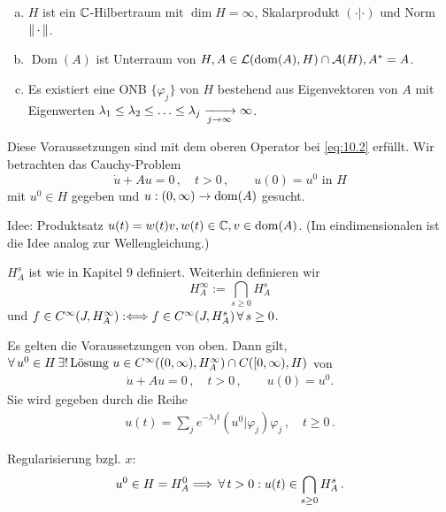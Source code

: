 \begin{vor}
\begin{enumerate}[(a)]
\item $H$ ist ein $\mathbb{C}$-Hilbertraum mit  $\dim H = \infty$, Skalarprodukt $( \cdot | \cdot  )$ und Norm $\lVert \,\cdot \,\rVert$.
\item $\operatorname{Dom}(A)$ ist Unterraum von $H, A \in \mathcal L(\operatorname{dom}(A),H)\cap \mathcal A(H), A^\ast = A$.
\item Es existiert eine ONB $\{\varphi_j\}$ von $H$ bestehend aus Eigenvektoren von $A$ mit Eigenwerten $\lambda_1 \leq \lambda_2 \leq \ldots \leq \lambda_j \xrightarrow[j \rightarrow \infty]{} \infty$.
\end{enumerate}
\end{vor}
Diese Voraussetzungen sind mit dem oberen Operator bei \eqref{eq:10.2} erfüllt. Wir betrachten das Cauchy-Problem
\[
	\dot u + A u = 0 \, , \quad t > 0 \, , \qquad u(0) = u^0 \text{ in } H
\]
mit $u^0 \in H$ gegeben und $u:(0,\infty) \rightarrow \operatorname{dom}(A)$ gesucht.

Idee: Produktsatz $u(t) = w(t) v, w(t) \in \mathbb{C}, v \in \operatorname{dom} (A)$. (Im eindimensionalen ist die Idee analog zur Wellengleichung.)

\begin{notation}
$H_A^s$ ist wie in Kapitel 9 definiert. Weiterhin definieren wir
\[
	H^\infty_A := \bigcap_{s\geq 0} H_A^s
\]
und $f \in C^{\infty}(J,H^\infty_A) :\Longleftrightarrow f \in C^\infty(J,H^s_A)\, \forall \, s \geq 0$. 
\end{notation}

\begin{theorem}
\label{theorem:10.8}
Es gelten die Voraussetzungen von oben. Dann gilt,
	$\forall \, u^0 \in H \, \exists! \, \text{Lösung } u \in C^\infty ((0,\infty),H^\infty_A) \cap C([0,\infty),H)$ von
\begin{align}
\label{eq:CP}
	\dot u +Au = 0 \, , \quad  t>0\, , \qquad u(0) = u^0  . \tag{CP}
\end{align}
Sie wird gegeben durch die Reihe
\begin{align}
\label{eq:10.3}
	u(t) = \sum_j e^{-\lambda_j t} (u^0|\varphi_j) \varphi_j \, , \quad t \geq 0 \, .
\end{align}
\end{theorem}

\begin{bem*}Regularisierung bzgl. $x$:
$$u^0 \in H = H^0_A \Longrightarrow \, \forall \, t > 0: u(t) \in \bigcap_{s\ge 0} H^s_A \, .$$
\end{bem*}

